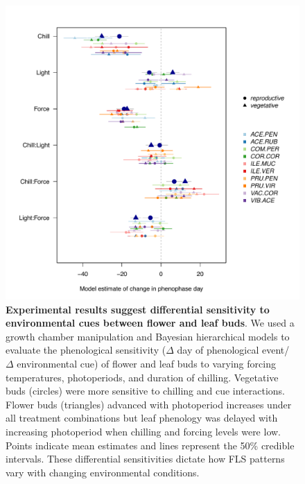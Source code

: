 \documentclass[11pt]{article}\usepackage[]{graphicx}\usepackage[]{color}
\begin{document}
{\begin{figure}[h!]
    \centering
         \includegraphics[width=\textwidth]{..//Plots/Flobuds_manuscript_figs/budburstvsflowering.pdf}
    \caption{\textbf{Experimental results suggest differential sensitivity to environmental cues between flower and leaf buds}. We used a growth chamber manipulation and Bayesian hierarchical models to evaluate the phenological sensitivity ($\Delta$ day of phenological event/ $\Delta$ environmental cue) of flower and leaf buds to varying forcing temperatures, photoperiods, and duration of chilling.   Vegetative buds (circles) were more sensitive to chilling and cue interactions. Flower buds (triangles) advanced with photoperiod increases under all treatment combinations but leaf phenology was delayed with increasing photoperiod when chilling and forcing levels were low. Points indicate mean estimates and lines represent the 50\% credible intervals. These differential sensitivities dictate how FLS patterns vary with changing environmental conditions.}
    \label{fig:model}
\end{figure}

}
\end{document}
